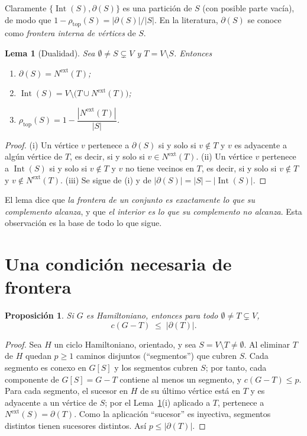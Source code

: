 \documentclass[11pt,a4paper]{article}
\newtheorem{lema}[teorema]{Lema}
\newtheorem{proposicion}[teorema]{Proposición}
\theoremstyle{definition}
\theoremstyle{remark}
\newcommand{\Int}{\operatorname{Int}}
\newcommand{\rtop}{\rho_{\mathrm{top}}}
\newcommand{\Nx}{N^{\mathrm{ext}}}
\begin{document}
Claramente $\{\Int(S),\partial(S)\}$ es una partición de $S$ (con posible parte vacía), de modo que $1-\rtop(S)=|\partial(S)|/|S|$. En la literatura, $\partial(S)$ se conoce como \emph{frontera interna de vértices} de $S$.

\begin{lema}[Dualidad]\label{lem:dualidad}
Sea $\emptyset\neq S\subsetneq V$ y $T=V\setminus S$. Entonces
\begin{enumerate}[label=(\roman*)]
\item $\partial(S)=\Nx(T)$;
\item $\Int(S)=V\setminus\big(T\cup\Nx(T)\big)$;
\item $\rtop(S)=1-\dfrac{|\Nx(T)|}{|S|}$.
\end{enumerate}
\end{lema}

\begin{proof}
(i) Un vértice $v$ pertenece a $\partial(S)$ si y solo si $v\notin T$ y $v$ es adyacente a algún vértice de $T$, es decir, si y solo si $v\in\Nx(T)$.
(ii) Un vértice $v$ pertenece a $\Int(S)$ si y solo si $v\notin T$ y $v$ no tiene vecinos en $T$, es decir, si y solo si $v\notin T$ y $v\notin \Nx(T)$.
(iii) Se sigue de (i) y de $|\partial(S)|=|S|-|\Int(S)|$.
\end{proof}

El lema dice que \emph{la frontera de un conjunto es exactamente lo que su complemento alcanza}, y que \emph{el interior es lo que su complemento no alcanza}. Esta observación es la base de todo lo que sigue.

\section{Una condición necesaria de frontera}\label{sec:necesaria}

\begin{proposicion}\label{prop:necesaria}
Si $G$ es Hamiltoniano, entonces para todo $\emptyset\neq T\subsetneq V$,
\[
c(G-T)\;\le\;|\partial(T)|.
\]
\end{proposicion}

\begin{proof}
Sea $H$ un ciclo Hamiltoniano, orientado, y sea $S=V\setminus T\neq\emptyset$. Al eliminar $T$ de $H$ quedan $p\ge 1$ caminos disjuntos (``segmentos'') que cubren $S$. Cada segmento es conexo en $G[S]$ y los segmentos cubren $S$; por tanto, cada componente de $G[S]=G-T$ contiene al menos un segmento, y $c(G-T)\le p$.
Para cada segmento, el sucesor en $H$ de su último vértice está en $T$ y es adyacente a un vértice de $S$; por el Lema~\ref{lem:dualidad}(i) aplicado a $T$, pertenece a $\Nx(S)=\partial(T)$. Como la aplicación ``sucesor'' es inyectiva, segmentos distintos tienen sucesores distintos. Así $p\le|\partial(T)|$.
\end{proof}
\end{document}
